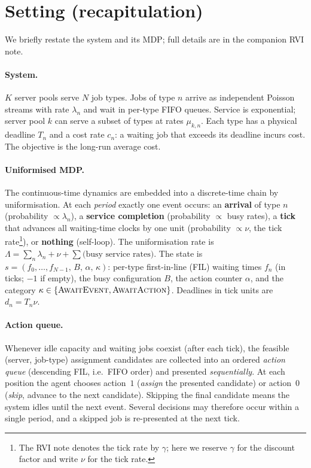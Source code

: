 \documentclass[11pt,a4paper]{article}
\begin{document}
\tableofcontents
\newpage

\section{Setting (recapitulation)}
\label{sec:setting}

We briefly restate the system and its MDP; full details are in the
companion RVI note.

\paragraph{System.}
$K$ server pools serve $N$ job types.  Jobs of type $n$ arrive as
independent Poisson streams with rate $\lambda_n$ and wait in per-type
FIFO queues.  Service is exponential; server pool $k$ can serve a subset
of types at rates $\mu_{k,n}$.  Each type has a physical deadline
$T_n$ and a cost rate $c_n$: a waiting job that exceeds its deadline
incurs cost.  The objective is the long-run average cost.

\paragraph{Uniformised MDP.}
The continuous-time dynamics are embedded into a discrete-time chain by
uniformisation.  At each \emph{period} exactly one event occurs:
an \textbf{arrival} of type $n$ (probability $\propto \lambda_n$),
a \textbf{service completion} (probability $\propto$ busy rates),
a \textbf{tick} that advances all waiting-time clocks by one unit
(probability $\propto \nu$, the tick rate\footnote{The RVI note denotes
the tick rate by $\gamma$; here we reserve $\gamma$ for the discount
factor and write $\nu$ for the tick rate.}), or
\textbf{nothing} (self-loop).  The uniformisation rate is
$\Lambda = \sum_n \lambda_n + \nu + \sum \text{(busy service rates)}$.
The state is $s = (f_0,\dots,f_{N-1},\, B,\, \alpha,\, \kappa)$: per-type
first-in-line (FIL) waiting times $f_n$ (in ticks; $-1$ if empty), the
busy configuration $B$, the action counter $\alpha$, and the category
$\kappa \in \{\textsc{AwaitEvent}, \textsc{AwaitAction}\}$.  Deadlines in
tick units are $d_n = T_n \nu$.

\paragraph{Action queue.}
Whenever idle capacity and waiting jobs coexist (after each tick), the
feasible (server, job-type) assignment candidates are collected into an
ordered \emph{action queue} (descending FIL, i.e.\ FIFO order) and
presented \emph{sequentially}.  At each position the agent chooses
action~$1$ (\emph{assign} the presented candidate) or action~$0$
(\emph{skip}, advance to the next candidate).  Skipping the final
candidate means the system idles until the next event.  Several decisions
may therefore occur within a single period, and a skipped job is
re-presented at the next tick.
\end{document}
